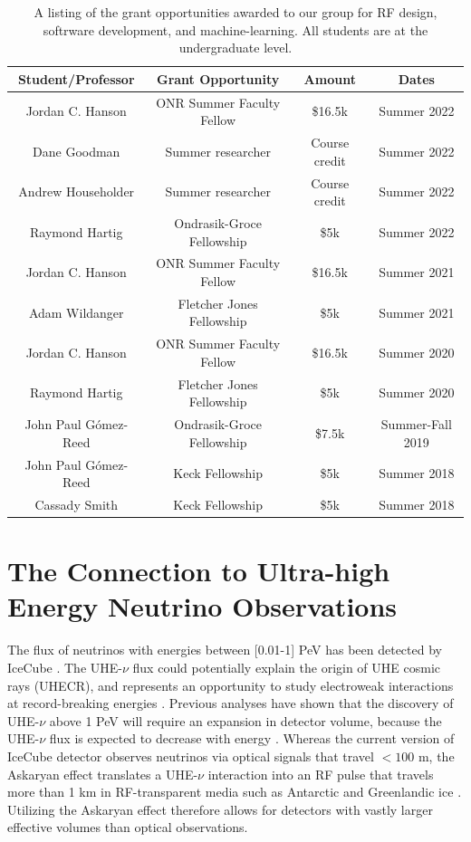 \documentclass[../../main.tex]{subfiles}
\begin{document}
\begin{table}
\centering
\begin{tabular}{c c c c}
Student/Professor & Grant Opportunity & Amount & Dates \\ \hline
Jordan C. Hanson & ONR Summer Faculty Fellow & \$16.5k & Summer 2022 \\
Dane Goodman & Summer researcher & Course credit & Summer 2022 \\
Andrew Householder & Summer researcher & Course credit & Summer 2022 \\
Raymond Hartig & Ondrasik-Groce Fellowship & \$5k & Summer 2022 \\
Jordan C. Hanson & ONR Summer Faculty Fellow & \$16.5k & Summer 2021 \\
Adam Wildanger & Fletcher Jones Fellowship & \$5k & Summer 2021 \\
Jordan C. Hanson & ONR Summer Faculty Fellow & \$16.5k & Summer 2020 \\
Raymond Hartig & Fletcher Jones Fellowship & \$5k & Summer 2020 \\
John Paul G\'{o}mez-Reed & Ondrasik-Groce Fellowship & \$7.5k & Summer-Fall 2019 \\
John Paul G\'{o}mez-Reed & Keck Fellowship & \$5k & Summer 2018 \\
Cassady Smith & Keck Fellowship & \$5k & Summer 2018 \\
\end{tabular}
\caption{\label{tab:funds} A listing of the grant opportunities awarded to our group for RF design, softrware development, and machine-learning.  All students are at the undergraduate level.}
\end{table}


\section{The Connection to Ultra-high Energy Neutrino Observations}
\label{sec:askaryan}

The flux of neutrinos with energies between [0.01-1] PeV has been detected by IceCube \cite{10.1126/science.1242856}.  The UHE-$\nu$ flux could potentially explain the origin of UHE cosmic rays (UHECR), and represents an opportunity to study electroweak interactions at record-breaking energies \cite{Ackermann:201946d,Ackermann:20195ec}.  Previous analyses have shown that the discovery of UHE-$\nu$ above 1 PeV will require an expansion in detector volume, because the UHE-$\nu$ flux is expected to decrease with energy \cite{10.1016/j.astropartphys.2010.06.003,10.1088/1475-7516/2010/10/013,10.1103/physrevd.98.062003,10.1088/1475-7516/2020/03/053,10.1103/physrevd.102.043021}.  Whereas the current version of IceCube detector observes neutrinos via optical signals that travel $<100$ m, the Askaryan effect translates a UHE-$\nu$ interaction into an RF pulse that travels more than 1 km in RF-transparent media such as Antarctic and Greenlandic ice \cite{10.3189/2015jog14j214, 10.3189/2015jog15j057, 10.1016/j.astropartphys.2011.11.010}.  Utilizing the Askaryan effect therefore allows for detectors with vastly larger effective volumes than optical observations. \\ \vspace{2.5mm}
\end{document}
